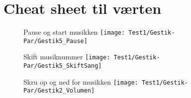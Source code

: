 \chapter{Cheat sheet til værten}
\label{app:CheatSheetTilVaerten}
%

\begin{figure}[H]
	\centering
	\huge{Pause og start musikken}
	\texttt{[image: Test1/Gestik-Par/Gestik5\_Pause]}
\end{figure}
\noindent
%
\begin{figure}[H]
	\centering
	\huge{Skift musiknummer}
	\texttt{[image: Test1/Gestik-Par/Gestik5\_SkiftSang]}
\end{figure}
\noindent
%
\begin{figure}[H]
	\centering
	\huge{Skru op og ned for musikken}
	\texttt{[image: Test1/Gestik-Par/Gestik2\_Volumen]}
\end{figure}
\noindent
%